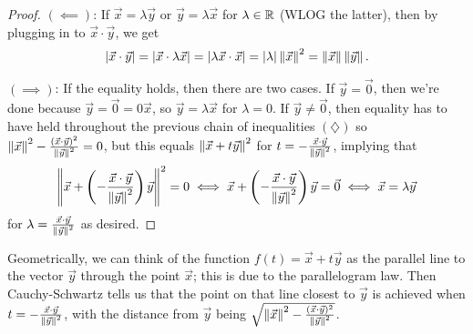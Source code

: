 \documentclass[main.tex]{subfiles}
\begin{document}
\begin{proof}
    $(\impliedby)$: If $\vec{x} = \lambda\vec{y}$ or $\vec{y} = \lambda\vec{x}$ for $\lambda\in \mathbb R$ (WLOG the latter), then by plugging in to $\vec{x}\cdot \vec{y}$, we get
    \[\left\lvert \vec{x}\cdot \vec{y} \right\rvert = \left\lvert \vec{x}\cdot \lambda\vec{x} \right\rvert = \left\lvert \lambda\vec{x}\cdot \vec{x} \right\rvert = \left\lvert \lambda \right\rvert \left\lVert \vec{x} \right\rVert^2 = \left\lVert \vec{x} \right\rVert \left\lVert \vec{y} \right\rVert.\]
    
    $(\implies)$: If the equality holds, then there are two cases. If $\vec{y} = \vec{0}$, then we're done because $\vec{y} = \vec{0} = 0\vec{x}$, so $\vec{y} = \lambda\vec{x}$ for $\lambda = 0$. If $\vec{y}\neq \vec{0}$, then equality has to have held throughout the previous chain of inequalities $(\diamondsuit)$ so $\left\lVert \vec{x} \right\rVert^2 - \frac{(\vec{x}\cdot \vec{y})^2}{\left\lVert \vec{y} \right\rVert^2} = 0$, but this equals $\left\lVert \vec{x} + t\vec{y} \right\rVert^2$ for $t = -\frac{\vec{x}\cdot \vec{y}}{\left\lVert \vec{y} \right\rVert^2}$, implying that
    \[\left\lVert \vec{x} + \left(-\frac{\vec{x}\cdot \vec{y}}{\left\lVert \vec{y} \right\rVert^2}\right)\vec{y} \right\rVert^2 = 0\iff \vec{x} + \left(-\frac{\vec{x}\cdot \vec{y}}{\left\lVert \vec{y} \right\rVert^2}\right)\vec{y} = \vec{0}\iff \vec{x} = \lambda \vec{y}\]
    for $\lambda = \frac{\vec{x} \cdot \vec{y}}{\left\lVert \vec{y} \right\rVert^2}$ as desired.
\end{proof}

Geometrically, we can think of the function $f(t) = \vec{x} + t\vec{y}$ as the parallel line to the vector $\vec{y}$ through the point $\vec{x}$; this is due to the parallelogram law. Then Cauchy-Schwartz tells us that the point on that line closest to $\vec{y}$ is achieved when $t = -\frac{\vec{x}\cdot \vec{y}}{\left\lVert \vec{y} \right\rVert^2}$, with the distance from $\vec{y}$ being $\sqrt{\left\lVert \vec{x} \right\rVert^2 - \frac{(\vec{x}\cdot \vec{y})^2}{\left\lVert \vec{y} \right\rVert^2}}$.
\end{document}
